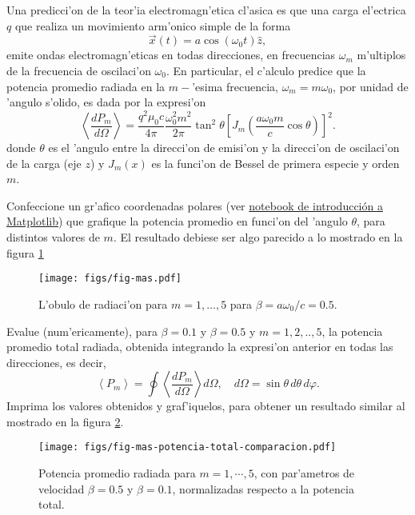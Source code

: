 \documentclass[11pt]{exam}
\begin{document}
 Una predicci'on de la teor'ia electromagn'etica cl'asica es que una carga el'ectrica $q$ que realiza un movimiento arm'onico simple de la forma
\begin{equation}
\vec{x}(t) = a\cos(\omega_0t)\hat{z},
\end{equation}
emite ondas electromagn'eticas en todas direcciones, en frecuencias $\omega_m$ m'ultiplos  de la frecuencia de oscilaci'on $\omega_0$. En particular, el c'alculo predice que la potencia promedio radiada en la $m-$'esima frecuencia, $\omega_m = m\omega_0$, por unidad de 'angulo s'olido, es dada por la expresi'on
\begin{equation}
\left\langle \frac{dP_{m}}{d\Omega}\right\rangle
=\frac{q^2\mu_0 c}{4\pi}\frac{\omega_0^2m^2}{2\pi}\tan^2\theta\left[ J_{m}\left(\frac{a\omega_0 m}{c}\cos\theta\right)  \right]^2.
\end{equation}
donde $\theta$ es el 'angulo entre la direcci'on de emisi'on y la direcci'on de oscilaci'on de la carga (eje $z$) y $J_m(x)$ es la funci'on de Bessel de primera especie y orden $m$.
\begin{parts}
\item Confeccione un gr'afico coordenadas polares (ver \href{https://github.com/PythonUdeC/CPC19/blob/master/04-Matplotlib.ipynb}{notebook de introducci\'on a Matplotlib}) que grafique la potencia promedio en funci'on del 'angulo $\theta$, para distintos valores de $m$. El resultado debiese ser algo parecido a lo mostrado en la figura \ref{TER2}
\begin{figure}[ht]
\centerline{\texttt{[image: figs/fig-mas.pdf]}}
\caption{L'obulo de radiaci'on para $m=1,\dots,5$ para $\beta=a\omega_0/c=0.5$.}
\label{TER2}
\end{figure}
\item Evalue (num'ericamente), para $\beta =0.1$ y $\beta = 0.5$ y $m = 1,2,..,5$,  la potencia promedio total radiada, obtenida integrando la expresi'on anterior en todas las direcciones, es decir,
\begin{equation}
\left\langle P_{m}\right\rangle  = \oint\left\langle \frac{dP_{m}}{d\Omega}\right\rangle d\Omega, \quad d\Omega = \sin\theta\,d\theta\,d\varphi.
\end{equation}
Imprima los valores obtenidos y graf'iquelos, para obtener un resultado similar al mostrado en la figura \ref{TER3}.
\begin{figure}[ht]
\centerline{\texttt{[image: figs/fig-mas-potencia-total-comparacion.pdf]}}
 \caption{Potencia promedio radiada para $m=1,\cdots,5$, con par'ametros de velocidad $\beta=0.5$ y  $\beta=0.1$, normalizadas respecto a la potencia total.}
\label{TER3}
\end{figure}
\end{parts}
\end{document}
